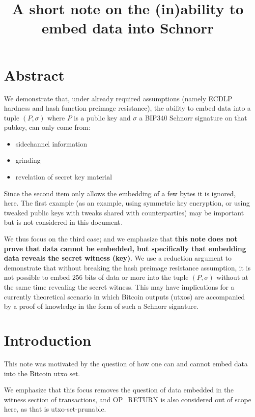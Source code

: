 \documentclass[10pt,a4paper]{article}
\title{A short note on the (in)ability to embed data into Schnorr}
\date{}
\theoremstyle{definition}   %
\theoremstyle{remark}       %
\begin{document}
\maketitle

\section{Abstract}

We demonstrate that, under already required assumptions (namely ECDLP hardness and hash function preimage resistance), the ability to embed data into a tuple $(P, \sigma)$ where $P$ is a public key and $\sigma$ a BIP340 Schnorr signature on that pubkey, can only come from:

\begin{itemize}
\item sidechannel information
\item grinding
\item revelation of secret key material
\end{itemize}

Since the second item only allows the embedding of a few bytes it is ignored, here. The first example (as an example, using symmetric key encryption, or using tweaked public keys with tweaks shared with counterparties) may be important but is not considered in this document.

\vskip 0.1in

We thus focus on the third case; and we emphasize that \textbf{this note does not prove that data cannot be embedded, but specifically that embedding data reveals the secret witness (key)}. We use a reduction argument to demonstrate that without breaking the hash preimage resistance assumption, it is not possible to embed 256 bits of data or more into the tuple $(P, \sigma)$ without at the same time revealing the secret witness. This may have implications for a currently theoretical scenario in which Bitcoin outputs (utxos) are accompanied by a proof of knowledge in the form of such a Schnorr signature.

\section{Introduction}

This note was motivated by the question of how one can and cannot embed data into the Bitcoin utxo set.

\vskip 0.2in

We emphasize that this focus removes the question of data embedded in the witness section of transactions, and OP\_RETURN is also considered out of scope here, as that is utxo-set-prunable.
\end{document}
